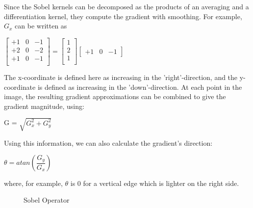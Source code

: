 Since the Sobel kernels can be decomposed as the products of an averaging and a differentiation kernel, they compute the gradient with smoothing. For example, \textbf{$G_{x}$}  can be written as

\begin{center}
$  \begin{bmatrix}
	+1 & 0 & -1 \\
	+2 & 0 & -2 \\
	+1 & 0 & -1 \\
   \end{bmatrix} =  \begin{bmatrix}
	1 \\
	2 \\
	1 \\
  \end{bmatrix} \begin{bmatrix}
	+1 & 0 & -1
  \end{bmatrix}
$
\end{center}


The x-coordinate is defined here as increasing in the 'right'-direction, and the y-coordinate is defined as increasing in the 'down'-direction. At each point in the image, the resulting gradient approximations can be combined to give the gradient magnitude, using:

\begin{center}
G = $\sqrt{ G_{x}^{2} + G_{y}^{2} }$
\end{center}

Using this information, we can also calculate the gradient's direction:

\begin{center}
$\theta = atan(\dfrac{G_{y}}{G_{x}})$
\end{center}

where, for example, $\theta$ is 0 for a vertical edge which is lighter on the right side.\cite{Sobel_Operator}


\begin{figure}[H]
  \centering
  \hfill
  \caption{Sobel Operator\cite{Sobel_Operator}}
\end{figure} 


